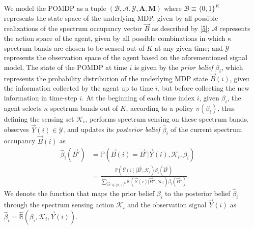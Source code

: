 \documentclass[10pt,twocolumn]{IEEEtran}
\begin{document}
We model the POMDP as a tuple $(\mathcal B,\mathcal{A},\mathcal{Y},\mathbf{A},\mathbf{M})$ where $\mathcal{B}\equiv\{0,1\}^K$ represents the state space of the underlying MDP, given by all possible realizations of the spectrum occupancy vector $\vec{B}$ as described by \eqref{5}; $\mathcal{A}$ represents the action space of the agent, given by all possible combinations in which $\kappa$ spectrum bands are chosen to be sensed out of $K$ at any given time; and $\mathcal{Y}$ represents the observation space of the agent based on the aforementioned signal model. The state of the POMDP at time $i$ is given by the \emph{prior belief} $\beta_i$, which represents the probability distribution of the underlying MDP state $\vec{B}(i)$, given the information collected by the agent up to time $i$, but before collecting the new information in time-step $i$. At the beginning of each time index $i$, given $\beta_i$, the agent selects $\kappa$ spectrum bands out of $K$, according to a policy $\pi(\beta_i)$, thus defining the sensing set $\mathcal K_i$, performs spectrum sensing  on these spectrum bands, observes $\vec{Y}(i){\in} \mathcal{Y}$, and updates its \emph{posterior belief} $\hat{\beta}_i$ of the current spectrum occupancy $\vec{B}(i)$ as 
\begin{align}\label{11}
\hat\beta_i(\vec{B}') &= \mathbb{P}(\vec{B}(i) = \vec{B}'|\vec{Y}(i), \mathcal K_i, \beta_i)\\&=
\nonumber
\frac{\mathbb{P}(\vec{Y}(i)|\vec{B}', \mathcal{K}_i) \beta_i(\vec{B}')}{
\sum_{\vec{B}'' {\in} \{0,1\}^K} \mathbb{P}(\vec{Y}(i)|\vec{B}'', \mathcal{K}_i) \beta_i(\vec{B}'')}.
\end{align}
We denote the function that maps the prior belief $\beta_i$ to the posterior belief $\hat\beta_i$ through the spectrum sensing action $\mathcal K_i$ and the observation signal $\vec{Y}(i)$ as $\hat\beta_i{=}\hat{\mathbb B}(\beta_i, \mathcal K_i, \vec{Y}(i))$.
\end{document}
